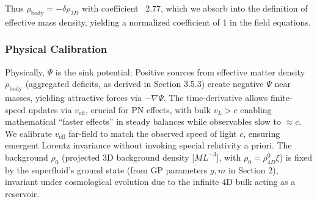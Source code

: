 \documentclass{article}
\begin{document}
Thus \(\rho_{\text{body}} = -\delta\rho_{3D}\) with coefficient ~2.77, which we absorb into the definition of effective mass density, yielding a normalized coefficient of 1 in the field equations.

\begin{center}
\end{center}

\subsubsection{Physical Calibration}

Physically, $\Psi$ is the sink potential: Positive sources from effective matter density $\rho_{\text{body}}$ (aggregated deficits, as derived in Section 3.5.3) create negative $\Psi$ near masses, yielding attractive forces via $-\nabla \Psi$. The time-derivative allows finite-speed updates via $v_{\text{eff}}$, crucial for PN effects, with bulk $v_L > c$ enabling mathematical ``faster effects'' in steady balances while observables slow to $\approx c$. We calibrate $v_{\text{eff}}$ far-field to match the observed speed of light $c$, ensuring emergent Lorentz invariance without invoking special relativity a priori. The background $\rho_0$ (projected 3D background density [$M L^{-3}$], with $\rho_0 = \rho_{4D}^0 \xi$) is fixed by the superfluid's ground state (from GP parameters $g, m$ in Section 2), invariant under cosmological evolution due to the infinite 4D bulk acting as a reservoir.
\end{document}
